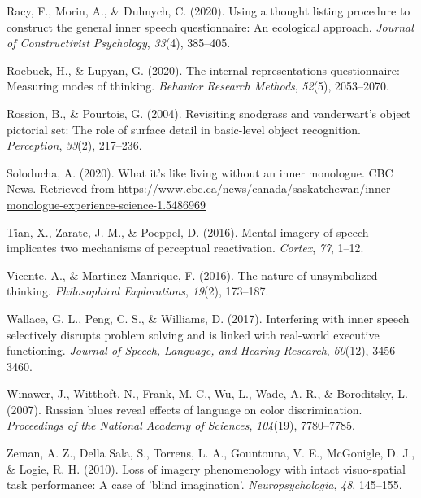 \documentclass[
  man,a4paper,floatsintext]{apa6}
\newlength{\cslhangindent}
\newlength{\cslentryspacingunit} %
\newenvironment{CSLReferences}[2] %
 {%
  \setlength{\parindent}{0pt}
  \ifodd #1
  \let\oldpar\par
  \def\par{\hangindent=\cslhangindent\oldpar}
  \fi
  \setlength{\parskip}{#2\cslentryspacingunit}
 }%
 {}
\begin{document}
\begin{CSLReferences}{1}{0}
\leavevmode{}%
Racy, F., Morin, A., \& Duhnych, C. (2020). Using a thought listing procedure to construct the general inner speech questionnaire: An ecological approach. \emph{Journal of Constructivist Psychology}, \emph{33}(4), 385--405.

\leavevmode{}%
Roebuck, H., \& Lupyan, G. (2020). The internal representations questionnaire: Measuring modes of thinking. \emph{Behavior Research Methods}, \emph{52}(5), 2053--2070.

\leavevmode{}%
Rossion, B., \& Pourtois, G. (2004). Revisiting snodgrass and vanderwart's object pictorial set: The role of surface detail in basic-level object recognition. \emph{Perception}, \emph{33}(2), 217--236.

\leavevmode{}%
Soloducha, A. (2020). What it's like living without an inner monologue. CBC News. Retrieved from \url{https://www.cbc.ca/news/canada/saskatchewan/inner-monologue-experience-science-1.5486969}

\leavevmode{}%
Tian, X., Zarate, J. M., \& Poeppel, D. (2016). Mental imagery of speech implicates two mechanisms of perceptual reactivation. \emph{Cortex}, \emph{77}, 1--12.

\leavevmode{}%
Vicente, A., \& Martinez-Manrique, F. (2016). The nature of unsymbolized thinking. \emph{Philosophical Explorations}, \emph{19}(2), 173--187.

\leavevmode{}%
Wallace, G. L., Peng, C. S., \& Williams, D. (2017). Interfering with inner speech selectively disrupts problem solving and is linked with real-world executive functioning. \emph{Journal of Speech, Language, and Hearing Research}, \emph{60}(12), 3456--3460.

\leavevmode{}%
Winawer, J., Witthoft, N., Frank, M. C., Wu, L., Wade, A. R., \& Boroditsky, L. (2007). Russian blues reveal effects of language on color discrimination. \emph{Proceedings of the National Academy of Sciences}, \emph{104}(19), 7780--7785.

\leavevmode{}%
Zeman, A. Z., Della Sala, S., Torrens, L. A., Gountouna, V. E., McGonigle, D. J., \& Logie, R. H. (2010). Loss of imagery phenomenology with intact visuo-spatial task performance: A case of 'blind imagination'. \emph{Neuropsychologia}, \emph{48}, 145--155.

\end{CSLReferences}
\end{document}
